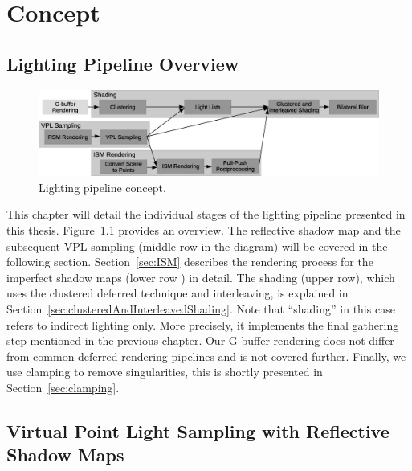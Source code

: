 
\chapter{Concept}

\section{Lighting Pipeline Overview}

\begin{figure}[h]
    \includegraphics[width=\textwidth]{graphics/Lighting_pipeline_concept_rough}
    \caption{Lighting pipeline concept.}
    \label{fig:LightingPipelineConcept}
\end{figure}




This chapter will detail the individual stages of the lighting pipeline presented in this thesis. Figure~\ref{fig:LightingPipelineConcept} provides an overview.
The reflective shadow map and the subsequent VPL sampling (middle row in the diagram) will be covered in the following section.
Section~\ref{sec:ISM} describes the rendering process for the imperfect shadow maps (lower row ) in detail.
The shading (upper row), which uses the clustered deferred technique and interleaving, is explained in Section~\ref{sec:clusteredAndInterleavedShading}. Note that ``shading'' in this case refers to indirect lighting only. More precisely, it implements the final gathering step mentioned in the previous chapter.
Our G-buffer rendering does not differ from common deferred rendering pipelines and is not covered further.
Finally, we use clamping to remove singularities, this is shortly presented in Section~\ref{sec:clamping}.


\section{Virtual Point Light Sampling with Reflective Shadow Maps}
\label{sec:RsmVplSampling}

